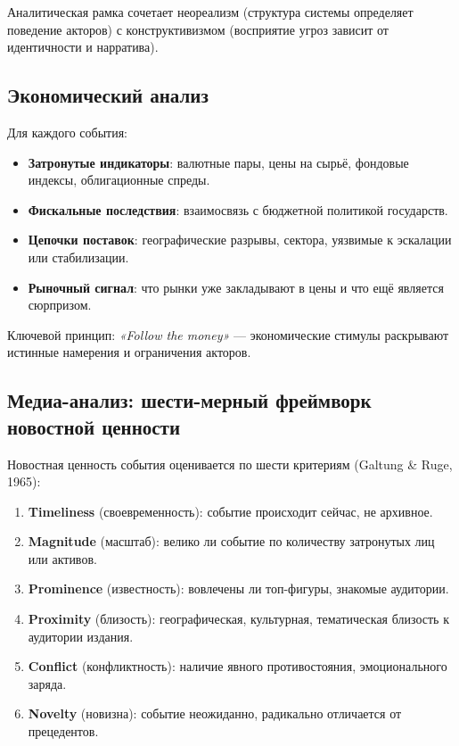 Аналитическая рамка сочетает неореализм (структура системы определяет поведение акторов) с конструктивизмом (восприятие угроз зависит от идентичности и нарратива).

\subsection{Экономический анализ}

Для каждого события:
\begin{itemize}
    \item \textbf{Затронутые индикаторы}: валютные пары, цены на сырьё, фондовые индексы, облигационные спреды.
    \item \textbf{Фискальные последствия}: взаимосвязь с бюджетной политикой государств.
    \item \textbf{Цепочки поставок}: географические разрывы, сектора, уязвимые к эскалации или стабилизации.
    \item \textbf{Рыночный сигнал}: что рынки уже закладывают в цены и что ещё является сюрпризом.
\end{itemize}

Ключевой принцип: \emph{«Follow the money»} — экономические стимулы раскрывают истинные намерения и ограничения акторов.

\subsection{Медиа-анализ: шести-мерный фреймворк новостной ценности}


Новостная ценность события оценивается по шести критериям (Galtung \& Ruge, 1965):

\begin{enumerate}
    \item \textbf{Timeliness} (своевременность): событие происходит сейчас, не архивное.
    \item \textbf{Magnitude} (масштаб): велико ли событие по количеству затронутых лиц или активов.
    \item \textbf{Prominence} (известность): вовлечены ли топ-фигуры, знакомые аудитории.
    \item \textbf{Proximity} (близость): географическая, культурная, тематическая близость к аудитории издания.
    \item \textbf{Conflict} (конфликтность): наличие явного противостояния, эмоционального заряда.
    \item \textbf{Novelty} (новизна): событие неожиданно, радикально отличается от прецедентов.
\end{enumerate}

